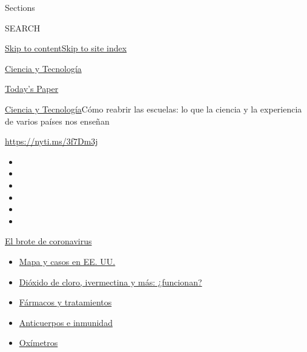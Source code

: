 Sections

SEARCH

\protect\hyperlink{site-content}{Skip to
content}\protect\hyperlink{site-index}{Skip to site index}

\href{https://www.nytimes3xbfgragh.onion/es/section/ciencia-y-tecnologia}{Ciencia
y Tecnología}

\href{https://myaccount.nytimes3xbfgragh.onion/auth/login?response_type=cookie\&client_id=vi}{}

\href{https://www.nytimes3xbfgragh.onion/section/todayspaper}{Today's
Paper}

\href{/es/section/ciencia-y-tecnologia}{Ciencia y
Tecnología}\textbar{}Cómo reabrir las escuelas: lo que la ciencia y la
experiencia de varios países nos enseñan

\url{https://nyti.ms/3f7Dm3j}

\begin{itemize}
\item
\item
\item
\item
\item
\item
\end{itemize}

\href{https://www.nytimes3xbfgragh.onion/es/spotlight/coronavirus?action=click\&pgtype=Article\&state=default\&region=TOP_BANNER\&context=storylines_menu}{El
brote de coronavirus}

\begin{itemize}
\tightlist
\item
  \href{https://www.nytimes3xbfgragh.onion/es/interactive/2020/espanol/mundo/coronavirus-en-estados-unidos.html?action=click\&pgtype=Article\&state=default\&region=TOP_BANNER\&context=storylines_menu}{Mapa
  y casos en EE. UU.}
\item
  \href{https://www.nytimes3xbfgragh.onion/es/2020/07/23/espanol/america-latina/bolivia-cloro-coronavirus-ivermectina.html?action=click\&pgtype=Article\&state=default\&region=TOP_BANNER\&context=storylines_menu}{Dióxido
  de cloro, ivermectina y más: ¿funcionan?}
\item
  \href{https://www.nytimes3xbfgragh.onion/es/interactive/2020/science/coronavirus-tratamientos-curas.html?action=click\&pgtype=Article\&state=default\&region=TOP_BANNER\&context=storylines_menu}{Fármacos
  y tratamientos}
\item
  \href{https://www.nytimes3xbfgragh.onion/es/2020/07/28/espanol/ciencia-y-tecnologia/anticuerpos-coronavirus-inmunidad.html?action=click\&pgtype=Article\&state=default\&region=TOP_BANNER\&context=storylines_menu}{Anticuerpos
  e inmunidad}
\item
  \href{https://www.nytimes3xbfgragh.onion/es/2020/04/29/espanol/estilos-de-vida/oximetro-para-que-sirve.html?action=click\&pgtype=Article\&state=default\&region=TOP_BANNER\&context=storylines_menu}{Oxímetros}
\end{itemize}

